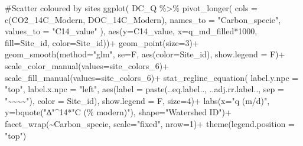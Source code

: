 \documentclass[
  letterpaper,
  DIV=11,
  numbers=noendperiod]{scrartcl}
\newenvironment{Shaded}{\begin{snugshade}}{\end{snugshade}}
\newcommand{\AttributeTok}[1]{\textcolor[rgb]{0.40,0.45,0.13}{#1}}
\newcommand{\CommentTok}[1]{\textcolor[rgb]{0.37,0.37,0.37}{#1}}
\newcommand{\DecValTok}[1]{\textcolor[rgb]{0.68,0.00,0.00}{#1}}
\newcommand{\FunctionTok}[1]{\textcolor[rgb]{0.28,0.35,0.67}{#1}}
\newcommand{\NormalTok}[1]{\textcolor[rgb]{0.00,0.23,0.31}{#1}}
\newcommand{\SpecialCharTok}[1]{\textcolor[rgb]{0.37,0.37,0.37}{#1}}
\newcommand{\StringTok}[1]{\textcolor[rgb]{0.13,0.47,0.30}{#1}}
\begin{document}
\begin{Shaded}
\begin{Highlighting}[]
\CommentTok{\#Scatter coloured by sites}
\FunctionTok{ggplot}\NormalTok{( DC\_Q }\SpecialCharTok{\%\textgreater{}\%} \FunctionTok{pivot\_longer}\NormalTok{(}
                     \AttributeTok{cols =} \FunctionTok{c}\NormalTok{(CO2\_14C\_Modern, DOC\_14C\_Modern),}
                     \AttributeTok{names\_to =} \StringTok{"Carbon\_specie"}\NormalTok{,}
                     \AttributeTok{values\_to =} \StringTok{"C14\_value"}
\NormalTok{                   ),}
       \FunctionTok{aes}\NormalTok{(}\AttributeTok{y=}\NormalTok{C14\_value, }\AttributeTok{x=}\NormalTok{q\_md\_filled}\SpecialCharTok{*}\DecValTok{1000}\NormalTok{, }\AttributeTok{fill=}\NormalTok{Site\_id, }\AttributeTok{color=}\NormalTok{Site\_id))}\SpecialCharTok{+}
  \FunctionTok{geom\_point}\NormalTok{(}\AttributeTok{size=}\DecValTok{3}\NormalTok{)}\SpecialCharTok{+}
  \FunctionTok{geom\_smooth}\NormalTok{(}\AttributeTok{method=}\StringTok{"glm"}\NormalTok{, }\AttributeTok{se=}\NormalTok{F, }\FunctionTok{aes}\NormalTok{(}\AttributeTok{color=}\NormalTok{Site\_id), }\AttributeTok{show.legend =}\NormalTok{ F)}\SpecialCharTok{+}
  \FunctionTok{scale\_color\_manual}\NormalTok{(}\AttributeTok{values=}\NormalTok{site\_colors\_6)}\SpecialCharTok{+} 
  \FunctionTok{scale\_fill\_manual}\NormalTok{(}\AttributeTok{values=}\NormalTok{site\_colors\_6)}\SpecialCharTok{+} 
  \FunctionTok{stat\_regline\_equation}\NormalTok{(}
  \AttributeTok{label.y.npc =} \StringTok{"top"}\NormalTok{, }\AttributeTok{label.x.npc =} \StringTok{"left"}\NormalTok{,}
  \FunctionTok{aes}\NormalTok{(}\AttributeTok{label =}  \FunctionTok{paste}\NormalTok{(..eq.label.., ..adj.rr.label.., }
                     \AttributeTok{sep =} \StringTok{"\textasciitilde{}\textasciitilde{}\textasciitilde{}\textasciitilde{}"}\NormalTok{), }\AttributeTok{color =}\NormalTok{ Site\_id), }
  \AttributeTok{show.legend =}\NormalTok{ F, }\AttributeTok{size=}\DecValTok{4}\NormalTok{)}\SpecialCharTok{+}
  \FunctionTok{labs}\NormalTok{(}\AttributeTok{x=}\StringTok{"q (m/d)"}\NormalTok{, }\AttributeTok{y=}\FunctionTok{bquote}\NormalTok{(}\StringTok{"∆"}\SpecialCharTok{\^{}}\DecValTok{14}\SpecialCharTok{*}\StringTok{"C (\% modern)"}\NormalTok{), }\AttributeTok{shape=}\StringTok{"Watershed ID"}\NormalTok{)}\SpecialCharTok{+}
  \FunctionTok{facet\_wrap}\NormalTok{(}\SpecialCharTok{\textasciitilde{}}\NormalTok{Carbon\_specie, }\AttributeTok{scale=}\StringTok{"fixed"}\NormalTok{, }\AttributeTok{nrow=}\DecValTok{1}\NormalTok{)}\SpecialCharTok{+}
  \FunctionTok{theme}\NormalTok{(}\AttributeTok{legend.position =} \StringTok{"top"}\NormalTok{)}
\end{Highlighting}
\end{Shaded}
\end{document}
